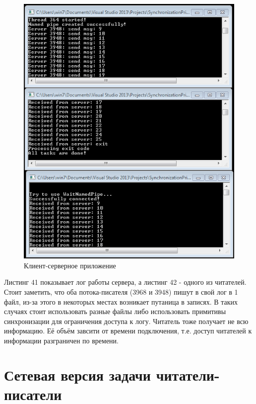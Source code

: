 \documentclass[a4paper, 12pt]{article}		%
\begin{document}
\begin{figure}[h!]
\centering
\includegraphics[scale=0.73]{res/012}
\caption{Клиент-серверное приложение}
\end{figure}

Листинг 41 показывает лог работы сервера, а листинг 42 - одного из читателей. Стоит заметить, что оба потока-писателя (3968 и 3948) пишут в свой лог в 1 файл, из-за этого в некоторых местах возникает путаница в записях. В таких случаях стоит использовать разные файлы либо использовать примитивы синхронизации для ограничения доступа к логу. Читатель тоже получает не всю информацию. Её объём завсити от времени подключения, т.е. доступ читателей к информации разграничен по времени.






\newpage
\section{Сетевая версия задачи читатели-писатели}
\end{document}
